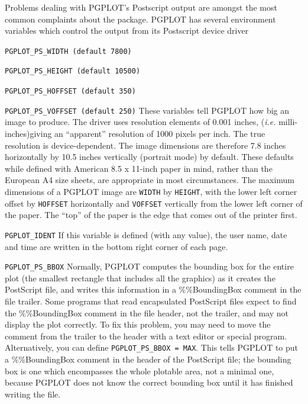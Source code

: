 \documentclass[twoside,11pt]{starlink}
\begin{document}
Problems dealing with PGPLOT's Postscript output are amongst the most
common complaints about the package. PGPLOT has several environment
variables which control the output from its Postscript device driver

\begin{description}

\item{\texttt{PGPLOT\_PS\_WIDTH (default 7800)}}
\item{\texttt{PGPLOT\_PS\_HEIGHT (default 10500)}}
\item{\texttt{PGPLOT\_PS\_HOFFSET (default 350)}}
\item{\texttt{PGPLOT\_PS\_VOFFSET (default 250)}}
These variables tell PGPLOT how big an image to produce. The driver
uses resolution elements of 0.001 inches, (\emph{i.e.}\/
milli-inches)giving an ``apparent'' resolution of 1000 pixels per
inch. The true resolution is device-dependent. The image dimensions
are therefore 7.8 inches horizontally by 10.5 inches vertically
(portrait mode) by default. These defaults while defined with American
8.5 x 11-inch paper in mind, rather than the European A4 size sheets,
are appropriate in most circumstances. The maximum dimensions of a
PGPLOT image are \texttt{WIDTH} by \texttt{HEIGHT}, with the lower left
corner offset by \texttt{HOFFSET} horizontally and \texttt{VOFFSET}
vertically from the lower left corner of the paper. The ``top'' of the
paper is the edge that comes out of the printer first.

\item{\texttt{PGPLOT\_IDENT}} If this variable is defined (with any
value), the user name, date and time are written in the bottom right
corner of each page.

\item{\texttt{PGPLOT\_PS\_BBOX}} Normally, PGPLOT computes the bounding
box for the entire plot (the smallest rectangle that includes all the
graphics) as it creates the PostScript file, and writes this
information in a \%\%BoundingBox comment in the file trailer. Some
programs that read encapsulated PostScript files expect to find the
\%\%BoundingBox comment in the file header, not the trailer, and may
not display the plot correctly. To fix this problem, you may need to
move the comment from the trailer to the header with a text editor or
special program. Alternatively, you can define \texttt{PGPLOT\_PS\_BBOX =
MAX}. This tells PGPLOT to put a \%\%BoundingBox comment in the header
of the PostScript file; the bounding box is one which encompasses the
whole plotable area, not a minimal one, because PGPLOT does not know
the correct bounding box until it has finished writing the file.


\end{description}
\end{document}
